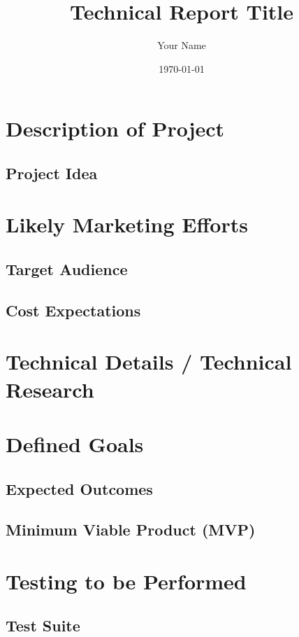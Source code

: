 \documentclass{report}
\title{Technical Report Title}
\author{Your Name}
\date{\today}
\begin{document}
\maketitle

\tableofcontents
\newpage

\chapter{Description of Project}
\section{Project Idea}
\lipsum[1­—2]

\chapter{Likely Marketing Efforts}
\section{Target Audience}
\lipsum[3]
\section{Cost Expectations}
\lipsum[4]

\chapter{Technical Details / Technical Research}
\lipsum[5—6]

\chapter{Defined Goals}
\section{Expected Outcomes}
\lipsum[7]
\section{Minimum Viable Product (MVP)}
\lipsum[8]

\chapter{Testing to be Performed}
\section{Test Suite}
\lipsum[9]
\end{document}
